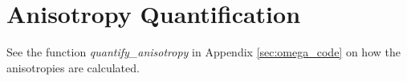 \section{Anisotropy Quantification}
\label{sec:anisotropy_code}

See the function \textit{quantify\_anisotropy} in Appendix \ref{sec:omega_code}
on how the anisotropies are calculated.
